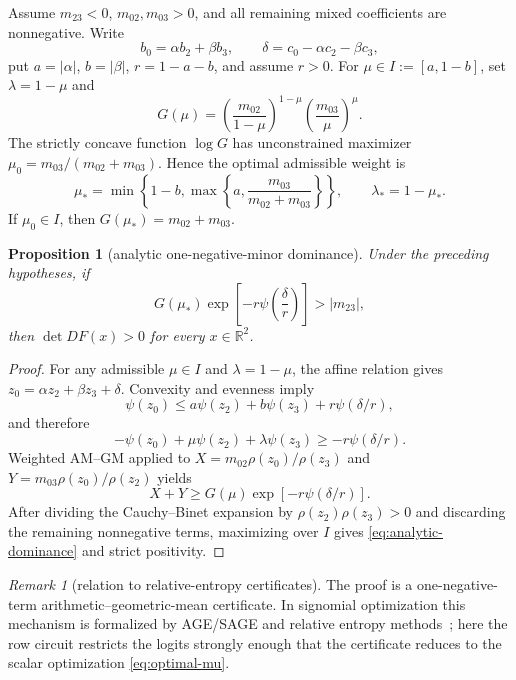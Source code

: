 \documentclass[11pt,twoside,leqno]{article}
\theoremstyle{plain}
\newtheorem{proposition}[proposition]{Proposition}
\theoremstyle{definition}
\theoremstyle{remark}
\newtheorem{remark}[remark]{Remark}
\newcommand{\R}{\mathbb{R}}
\begin{document}
Assume $m_{23}<0$, $m_{02},m_{03}>0$, and all remaining mixed coefficients are nonnegative.  Write
\[
 b_0=\alpha b_2+\beta b_3,\qquad
 \delta=c_0-\alpha c_2-\beta c_3,
\]
put $a=|\alpha|$, $b=|\beta|$, $r=1-a-b$, and assume $r>0$.  For $\mu\in I:=[a,1-b]$, set $\lambda=1-\mu$ and
\[
 G(\mu)=
 \left(\frac{m_{02}}{1-\mu}\right)^{1-\mu}
 \left(\frac{m_{03}}{\mu}\right)^{\mu}.
\]
The strictly concave function $\log G$ has unconstrained maximizer $\mu_0=m_{03}/(m_{02}+m_{03})$.  Hence the optimal admissible weight is
\begin{equation}\label{eq:optimal-mu}
 \mu_* = \min\!\left\{1-b,\max\!\left\{a,
 \frac{m_{03}}{m_{02}+m_{03}}\right\}\right\},
 \qquad \lambda_*=1-\mu_*.
\end{equation}
If $\mu_0\in I$, then $G(\mu_*)=m_{02}+m_{03}$.

\begin{proposition}[analytic one-negative-minor dominance]\label{prop:analytic-det}
Under the preceding hypotheses, if
\begin{equation}\label{eq:analytic-dominance}
 G(\mu_*)\exp\!\left[-r\psi\!\left(\frac{\delta}{r}\right)\right]
 >|m_{23}|,
\end{equation}
then $\det DF(x)>0$ for every $x\in\R^2$.
\end{proposition}
\begin{proof}
For any admissible $\mu\in I$ and $\lambda=1-\mu$, the affine relation gives $z_0=\alpha z_2+\beta z_3+\delta$.  Convexity and evenness imply
\[
 \psi(z_0)\le a\psi(z_2)+b\psi(z_3)+r\psi(\delta/r),
\]
and therefore
\[
 -\psi(z_0)+\mu\psi(z_2)+\lambda\psi(z_3)
 \ge-r\psi(\delta/r).
\]
Weighted AM--GM applied to $X=m_{02}\rho(z_0)/\rho(z_3)$ and $Y=m_{03}\rho(z_0)/\rho(z_2)$ yields
\[
 X+Y\ge G(\mu)\exp[-r\psi(\delta/r)].
\]
After dividing the Cauchy--Binet expansion by $\rho(z_2)\rho(z_3)>0$ and discarding the remaining nonnegative terms, maximizing over $I$ gives \eqref{eq:analytic-dominance} and strict positivity.
\end{proof}

\begin{remark}[relation to relative-entropy certificates]\label{rmk:sage}
The proof is a one-negative-term arithmetic--geometric-mean certificate.  In signomial optimization this mechanism is formalized by AGE/SAGE and relative entropy methods~\cite{chandrasekaran-shah}; here the row circuit restricts the logits strongly enough that the certificate reduces to the scalar optimization \eqref{eq:optimal-mu}.
\end{remark}
\end{document}
